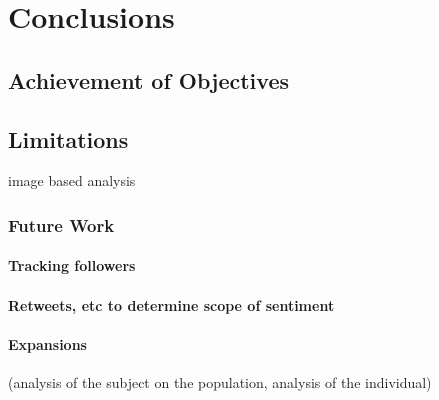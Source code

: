 \documentclass[12pt,twoside]{report}
\begin{document}
\chapter{Conclusions}
	\section{Achievement of Objectives}
	\section{Limitations}
	image based analysis
		\subsection{Future Work}
			\subsubsection{Tracking followers}
			\subsubsection{Retweets, etc to determine scope of sentiment}
			\subsubsection{Expansions}
			(analysis of the subject on the population, analysis of the individual)


\end{document}
